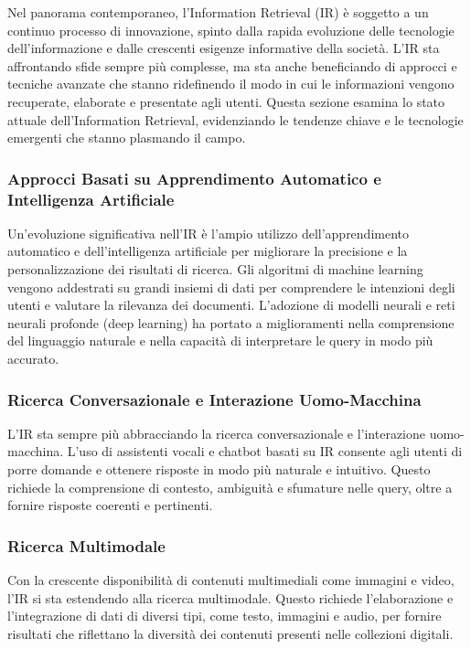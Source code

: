 Nel panorama contemporaneo, l'Information Retrieval (IR) è soggetto a un continuo processo di innovazione, spinto dalla rapida evoluzione delle tecnologie dell'informazione e dalle crescenti esigenze informative della società. L'IR sta affrontando sfide sempre più complesse, ma sta anche beneficiando di approcci e tecniche avanzate che stanno ridefinendo il modo in cui le informazioni vengono recuperate, elaborate e presentate agli utenti. Questa sezione esamina lo stato attuale dell'Information Retrieval, evidenziando le tendenze chiave e le tecnologie emergenti che stanno plasmando il campo.

\subsubsection{Approcci Basati su Apprendimento Automatico e Intelligenza Artificiale}
Un'evoluzione significativa nell'IR è l'ampio utilizzo dell'apprendimento automatico e dell'intelligenza artificiale per migliorare la precisione e la personalizzazione dei risultati di ricerca. Gli algoritmi di machine learning vengono addestrati su grandi insiemi di dati per comprendere le intenzioni degli utenti e valutare la rilevanza dei documenti. L'adozione di modelli neurali e reti neurali profonde (deep learning) ha portato a miglioramenti nella comprensione del linguaggio naturale e nella capacità di interpretare le query in modo più accurato.

\subsubsection{Ricerca Conversazionale e Interazione Uomo-Macchina}
L'IR sta sempre più abbracciando la ricerca conversazionale e l'interazione uomo-macchina. L'uso di assistenti vocali e chatbot basati su IR consente agli utenti di porre domande e ottenere risposte in modo più naturale e intuitivo. Questo richiede la comprensione di contesto, ambiguità e sfumature nelle query, oltre a fornire risposte coerenti e pertinenti.

\subsubsection{Ricerca Multimodale}
Con la crescente disponibilità di contenuti multimediali come immagini e video, l'IR si sta estendendo alla ricerca multimodale. Questo richiede l'elaborazione e l'integrazione di dati di diversi tipi, come testo, immagini e audio, per fornire risultati che riflettano la diversità dei contenuti presenti nelle collezioni digitali.


